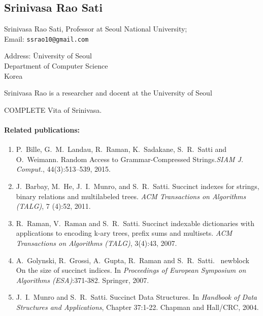 \documentclass[a4paper,10pt]{article}
\begin{document}
\subsection*{Srinivasa Rao Sati}

\begin{multicols}{2}
\noindent Srinivasa Rao Sati, Professor at Seoul National  University; \\
Email: \texttt{ssrao10@gmail.com} \\
\begin{tabbing}
Address: \=  University of Seoul\\
\> Department of Computer Science\\
\> Korea
\end{tabbing}
\end{multicols}

Srinivasa Rao  is a researcher and docent at the University of Seoul
\begin{TODO}
COMPLETE Vita of Srinivasa.
\end{TODO}

\paragraph{Related publications:}
\begin{enumerate}
\item P.~Bille, G.~M.~Landau, R.~Raman, K.~Sadakane, S.~R.~Satti and O.~Weimann. \newblock Random Access to Grammar-Compressed Strings.\newblock \emph{{SIAM} J. Comput.}, 44(3):513--539, 2015.
\item J.~Barbay, M.~He, J.~I.~Munro, and S.~R.~Satti. \newblock Succinct indexes for strings, binary relations and multilabeled trees. \newblock \emph{ACM Transactions on Algorithms (TALG)}, 7 (4):52, 2011.
\item R.~Raman, V.~Raman and S.~R.~Satti. \newblock Succinct indexable dictionaries with applications to encoding k-ary trees, prefix sums and multisets. \newblock \emph{ACM Transactions on Algorithms (TALG)}, 3(4):43, 2007.
\item A.~Golynski, R.~Grossi, A.~Gupta, R.~Raman and S.~R.~Satti. \ newblock On the size of succinct indices. \newblock In \emph {Proceedings of European Symposium on Algorithms (ESA)}:371-382.  Springer, 2007.
\item J.~I.~Munro and S.~R.~Satti. \newblock Succinct Data Structures. \newblock In \emph{Handbook of Data Structures and Applications}, Chapter 37:1-22. {Chapman and Hall/CRC}, 2004.
\end{enumerate}
\end{document}
